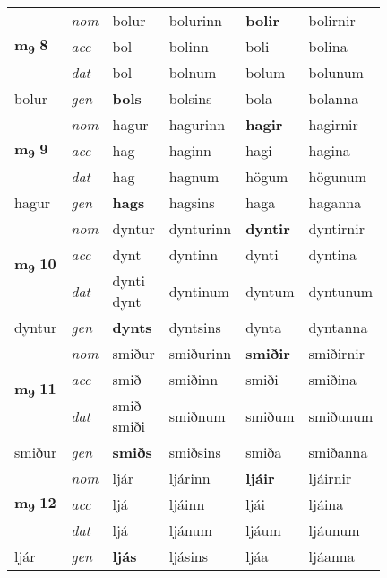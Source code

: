 \begin{longtable}[l]{X>{\footnotesize\itshape}XXXXX}
\multirow{3}{*}{{{\textbf{m{\textsubscript{9}}} \Large{\textbf{8}}}}} & nom & bolur & bolurinn & \textbf{bolir} & bolirnir \\*
 & acc & bol & bolinn & boli & bolina \\*
 & dat & bol & bolnum & bolum & bolunum \\*
 {\footnotesize{bolur}} & gen & \textbf{bols} & bolsins & bola & bolanna \\
\midrule

\multirow{3}{*}{{{\textbf{m{\textsubscript{9}}} \Large{\textbf{9}}}}} & nom & hagur & hagurinn & \textbf{hagir} & hagirnir \\*
 & acc & hag & haginn & hagi & hagina \\*
 & dat & hag & hagnum & högum & högunum \\*
 {\footnotesize{hagur}} & gen & \textbf{hags} & hagsins & haga & haganna \\
\midrule

\multirow{3}{*}{{{\textbf{m{\textsubscript{9}}} \Large{\textbf{10}}}}} & nom & dyntur & dynturinn & \textbf{dyntir} & dyntirnir \\*
 & acc & dynt & dyntinn & dynti & dyntina \\*
 & dat & \specialcell{dynti\\ dynt} & dyntinum & dyntum & dyntunum \\*
 {\footnotesize{dyntur}} & gen & \textbf{dynts} & dyntsins & dynta & dyntanna \\
\midrule

\multirow{3}{*}{{{\textbf{m{\textsubscript{9}}} \Large{\textbf{11}}}}} & nom & smiður & smiðurinn & \textbf{smiðir} & smiðirnir \\*
 & acc & smið & smiðinn & smiði & smiðina \\*
 & dat & \specialcell{smið\\ smiði} & smiðnum & smiðum & smiðunum \\*
 {\footnotesize{smiður}} & gen & \textbf{smiðs} & smiðsins & smiða & smiðanna \\
\midrule

\multirow{3}{*}{{{\textbf{m{\textsubscript{9}}} \Large{\textbf{12}}}}} & nom & ljár & ljárinn & \textbf{ljáir} & ljáirnir \\*
 & acc & ljá & ljáinn & ljái & ljáina \\*
 & dat & ljá & ljánum & ljáum & ljáunum \\*
 {\footnotesize{ljár}} & gen & \textbf{ljás} & ljásins & ljáa & ljáanna \\
\midrule


\end{longtable}
